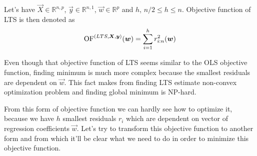 \begin{definition} Let's have $\vec{X} \in \mathbb{R}^{n,p}$, $\vec{y} \in \mathbb{R}^{n,1}$, 
    $\vec{w} \in \mathbb{R}^p$ and $h$, $ n/2 \leq h \leq n$. Objective function of LTS is then denoted as 
    \begin{equation} 
        \operatorname{OF}^{(LTS,\boldsymbol{X}, \boldsymbol{y})}(\boldsymbol{w}) =  \sum\limits_{i=1}^h r_{i:n}^2(\boldsymbol{w})  
    \end{equation}
\end{definition}

Even though that objective function of LTS seems similar to the OLS objective function, finding minimum is much more complex because the smallest residuals are dependent on $\vec{w}$. This fact makes from finding LTS estimate non-convex optimization problem and finding global minimum is NP-hard. 

From this form of objective function we can hardly see how to optimize it, because we have $h$ smallest residuals $r_i$ which are dependent on vector of regression coefficients $\vec{w}$. 
Let's try to transform this objective function to another form and from which it'll be clear what we need to do in order to minimize this objective function.



